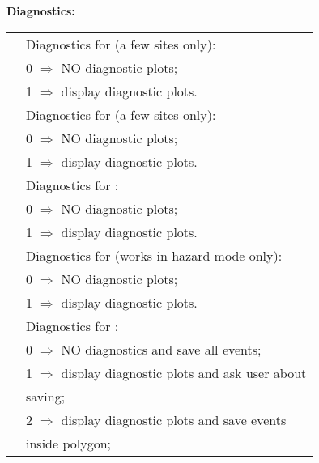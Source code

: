 \vspace{2em} \textbf{Diagnostics:}

\begin{supertabular}{lp{0.6\textwidth}}
 & Diagnostics for  (a few sites only): \\
 & \hspace{0.5em} 0 $\Rightarrow$ NO diagnostic plots; \\
 & \hspace{0.5em} 1 $\Rightarrow$ display diagnostic plots.      \\
  &   Diagnostics for  (a few sites only): \\
& \hspace{0.5em} 0 $\Rightarrow$ NO diagnostic plots; \\
& \hspace{0.5em} 1 $\Rightarrow$ display diagnostic plots.  \\
  &   Diagnostics for : \\
& \hspace{0.5em} 0 $\Rightarrow$ NO diagnostic plots; \\
& \hspace{0.5em} 1 $\Rightarrow$ display diagnostic plots.  \\
   &  Diagnostics for  (works in hazard mode only): \\
& \hspace{0.5em} 0 $\Rightarrow$ NO diagnostic plots; \\
& \hspace{0.5em} 1 $\Rightarrow$ display diagnostic plots. \\
 &  Diagnostics for : \\
& \hspace{0.5em} 0 $\Rightarrow$ NO diagnostics and save all events; \\
& \hspace{0.5em} 1 $\Rightarrow$ display diagnostic plots and ask user about \\
& \hspace{2.8em} saving; \\
& \hspace{0.5em} 2 $\Rightarrow$ display diagnostic plots and save events \\
& \hspace{2.8em} inside polygon; \\

\end{supertabular}

